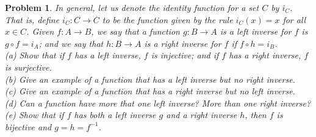 \documentclass{article}
\newtheorem{problem}{Problem}
\begin{document}
\begin{problem}
In general, let us denote the \emph{identity function} for a set $C$ by $i_C$. That is, define $i_C : C \to C$ to be the function given by the rule $i_C(x) = x$ for all $x \in C$. Given $f : A \to B$, we say that a function $g : B \to A$ is a \emph{left inverse} for $f$ is $g \circ f = i_A$; and we say that $h : B \to A$ is a \emph{right inverse} for $f$ if $f \circ h = i_B$.\\
(a) Show that if $f$ has a left inverse, $f$ is injective; and if $f$ has a right inverse, $f$ is surjective.\\
(b) Give an example of a function that has a left inverse but no right inverse.\\
(c) Give an example of a function that has a right inverse but no left inverse.\\
(d) Can a function have more that one left inverse? More than one right inverse?\\
(e) Show that if $f$ has both a left inverse $g$ and a right inverse $h$, then $f$ is bijective and $g = h = f^{-1}$.
\end{problem}
\end{document}

